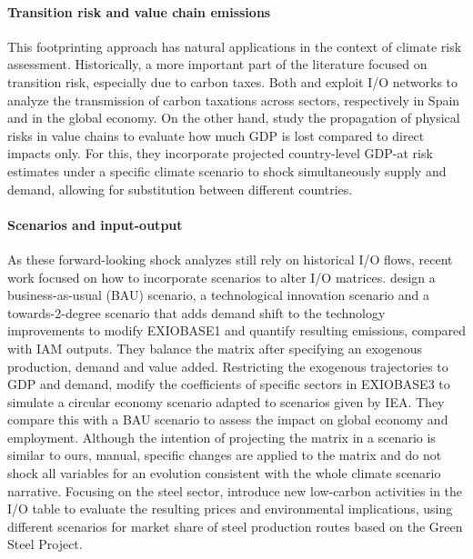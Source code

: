 \documentclass[11pt,a4paper]{article}
\begin{document}
\paragraph{Transition risk and value chain emissions}
\label{sub:transition_lit}
This footprinting approach has natural applications in the context of climate risk assessment. Historically, a more important part of the literature focused on transition risk, especially due to carbon taxes. Both \cite{aguilar2023green} and \cite{devulder2020carbon} exploit I/O networks to analyze the transmission of carbon taxations across sectors, respectively in Spain and in the global economy. On the other hand, \cite{fahr2024globalization} study the propagation of physical risks in value chains to evaluate how much GDP is lost compared to direct impacts only. For this, they incorporate projected country-level GDP-at risk estimates under a specific climate scenario to shock simultaneously supply and demand, allowing for substitution between different countries.

\paragraph{Scenarios and input-output}
\label{sub:exogenous}
As these forward-looking shock analyzes still rely on historical I/O flows, recent work focused on how to incorporate scenarios to alter I/O matrices. \cite{de2016scenarios} design a business-as-usual (BAU) scenario, a technological innovation scenario and a towards-2-degree scenario that adds demand shift to the technology improvements to modify EXIOBASE1 and quantify resulting emissions, compared with IAM outputs. They balance the matrix after specifying an exogenous production, demand and value added. Restricting the exogenous trajectories to GDP and demand, \citet{wiebe19} modify the coefficients of specific sectors in EXIOBASE3 to simulate a circular economy scenario adapted to scenarios given by IEA. They compare this with a BAU scenario to assess the impact on global economy and employment. Although the intention of projecting the matrix in a scenario is similar to ours, manual, specific changes are applied to the matrix and do not shock all variables for an evolution consistent with the whole climate scenario narrative. Focusing on the steel sector, \cite{rinaldi2024assessing} introduce new low-carbon activities in the I/O table to evaluate the resulting prices and environmental implications, using different scenarios for market share of steel production routes based on the Green Steel Project.
\end{document}
